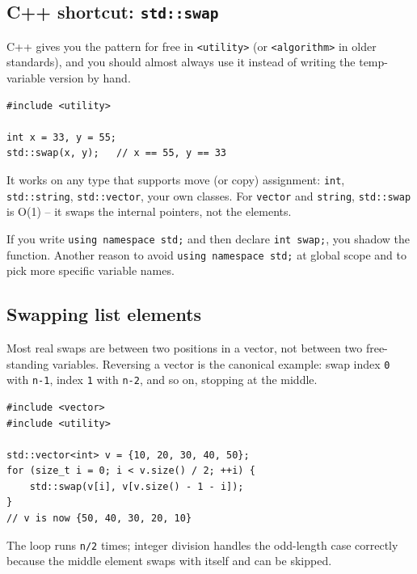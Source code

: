 \documentclass[11pt]{article}
\begin{document}
\subsection{C++ shortcut: \texttt{std::swap}}

C++ gives you the pattern for free in \texttt{<utility>} (or
\texttt{<algorithm>} in older standards), and you should almost always
use it instead of writing the temp-variable version by hand.

\begin{examplebox}
\begin{verbatim}
#include <utility>

int x = 33, y = 55;
std::swap(x, y);   // x == 55, y == 33
\end{verbatim}
It works on any type that supports move (or copy) assignment: \texttt{int},
\texttt{std::string}, \texttt{std::vector}, your own classes. For
\texttt{vector} and \texttt{string}, \texttt{std::swap} is O(1) -- it swaps
the internal pointers, not the elements.
\end{examplebox}

\begin{warnbox}
If you write \texttt{using namespace std;} and then declare
\texttt{int swap;}, you shadow the function. Another reason to avoid
\texttt{using namespace std;} at global scope and to pick more specific
variable names.
\end{warnbox}

\subsection{Swapping list elements}

Most real swaps are between two positions in a vector, not between two
free-standing variables. Reversing a vector is the canonical example:
swap index \texttt{0} with \texttt{n-1}, index \texttt{1} with \texttt{n-2},
and so on, stopping at the middle.

\begin{examplebox}
\begin{verbatim}
#include <vector>
#include <utility>

std::vector<int> v = {10, 20, 30, 40, 50};
for (size_t i = 0; i < v.size() / 2; ++i) {
    std::swap(v[i], v[v.size() - 1 - i]);
}
// v is now {50, 40, 30, 20, 10}
\end{verbatim}
The loop runs \texttt{n/2} times; integer division handles the odd-length
case correctly because the middle element swaps with itself and can be
skipped.
\end{examplebox}
\end{document}
